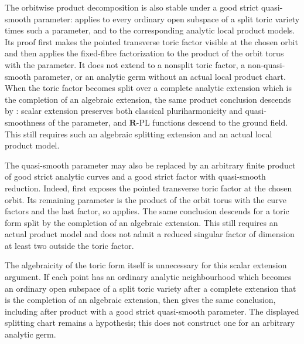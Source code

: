 





The orbitwise product decomposition is also stable under a good strict
quasi-smooth parameter: 
applies to every ordinary open subspace of a split toric variety times such
a parameter, and to the corresponding analytic local product models.  Its
proof first makes the pointed transverse toric factor visible at the chosen
orbit and then applies the fixed-fibre factorization to the product of the
orbit torus with the parameter.  It does not extend to a nonsplit toric
factor, a non-quasi-smooth parameter, or an analytic germ without an actual
local product chart.
When the toric factor becomes split over a complete analytic extension which
is the completion of an algebraic extension, the same product conclusion
descends by : scalar extension
preserves both classical pluriharmonicity and quasi-smoothness of the
parameter, and \(\mathbf R\)-PL functions descend to the ground field.  This
still requires such an algebraic splitting extension and an actual local
product model.

The quasi-smooth parameter may also be replaced by an arbitrary finite
product of good strict analytic curves and a good strict factor with
quasi-smooth reduction.  Indeed,
 first exposes the
pointed transverse toric factor at the chosen orbit.  Its remaining
parameter is the product of the orbit torus with the curve factors and the
last factor, so  applies.
The same conclusion descends for a toric form split by the completion of an
algebraic extension.  This still requires an actual product model and does
not admit a reduced singular factor of dimension at least two outside the
toric factor.

The algebraicity of the toric form itself is unnecessary for this scalar
extension argument.  If each point has an ordinary analytic neighbourhood
which becomes an ordinary open subspace of a split toric variety after a
complete extension that is the completion of an algebraic extension, then
 gives the same
conclusion, including after product with a good strict quasi-smooth
parameter.  The displayed splitting chart remains a hypothesis; this does
not construct one for an arbitrary analytic germ.

